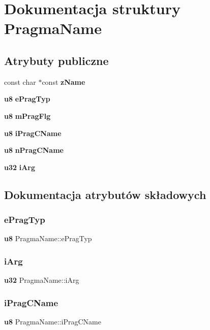 \section{Dokumentacja struktury Pragma\+Name}
\label{struct_pragma_name}
\subsection*{Atrybuty publiczne}
\begin{DoxyCompactItemize}
\item 
const char $\ast$const \textbf{ z\+Name}
\item 
\textbf{ u8} \textbf{ e\+Prag\+Typ}
\item 
\textbf{ u8} \textbf{ m\+Prag\+Flg}
\item 
\textbf{ u8} \textbf{ i\+Prag\+C\+Name}
\item 
\textbf{ u8} \textbf{ n\+Prag\+C\+Name}
\item 
\textbf{ u32} \textbf{ i\+Arg}
\end{DoxyCompactItemize}


\subsection{Dokumentacja atrybutów składowych}
\mbox{\label{struct_pragma_name_a62d8aae764f7d69ea67d62645d05d327}} 
\subsubsection{ePragTyp}
{\footnotesize\ttfamily \textbf{ u8} Pragma\+Name\+::e\+Prag\+Typ}

\mbox{\label{struct_pragma_name_a98bfb2789703b42fe3964df26c0f6b8a}} 
\subsubsection{iArg}
{\footnotesize\ttfamily \textbf{ u32} Pragma\+Name\+::i\+Arg}

\mbox{\label{struct_pragma_name_ad979162577450238dc72b1a2c11ddbfb}} 
\subsubsection{iPragCName}
{\footnotesize\ttfamily \textbf{ u8} Pragma\+Name\+::i\+Prag\+C\+Name}

